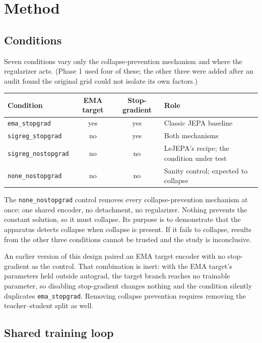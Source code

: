 \section{Method}

\subsection{Conditions}

Seven conditions vary only the collapse-prevention mechanism and where the regularizer acts. (Phase 1 used four of these; the other three were added after an audit found the original grid could not isolate its own factors.)

\begin{table}[h]
\centering
\small
\begin{tabular}{l c c l}
\toprule
\textbf{Condition} & \textbf{EMA target} & \textbf{Stop-gradient} & \textbf{Role} \\
\midrule
\texttt{ema\_stopgrad} & yes & yes & Classic JEPA baseline \\
\texttt{sigreg\_stopgrad} & no & yes & Both mechanisms \\
\texttt{sigreg\_nostopgrad} & no & no & LeJEPA's recipe; the condition under test \\
\texttt{none\_nostopgrad} & no & no & Sanity control; expected to collapse \\
\bottomrule
\end{tabular}
\end{table}

The \texttt{none\_nostopgrad} control removes every collapse-prevention mechanism at once:
one shared encoder, no detachment, no regularizer. Nothing prevents the constant solution,
so it must collapse. Its purpose is to demonstrate that the apparatus detects collapse when
collapse is present. If it fails to collapse, results from the other three conditions
cannot be trusted and the study is inconclusive.

An earlier version of this design paired an EMA target encoder with no stop-gradient as the
control. That combination is inert: with the EMA target's parameters held outside autograd,
the target branch reaches no trainable parameter, so disabling stop-gradient changes nothing
and the condition silently duplicates \texttt{ema\_stopgrad}. Removing collapse prevention
requires removing the teacher--student split as well.

\subsection{Shared training loop}

